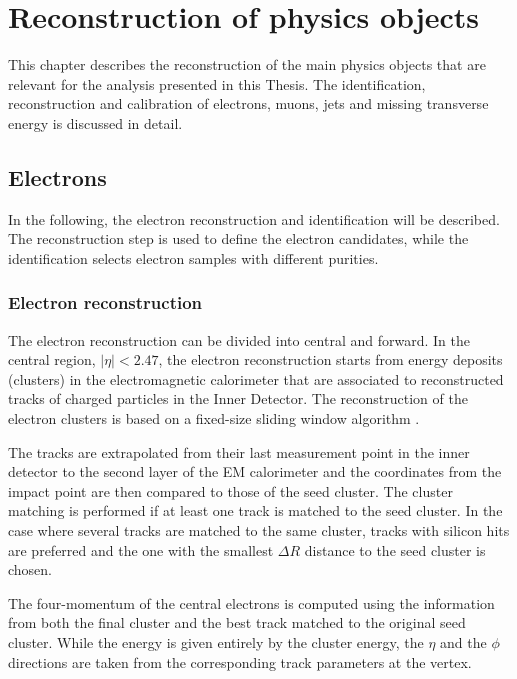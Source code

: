 \chapter{Reconstruction of physics objects}
    \label{chapter:ReconstructionOfObjects}

This chapter describes the reconstruction of the main physics objects that are relevant for the analysis presented in this Thesis.
The identification, reconstruction and calibration of electrons, muons, jets and missing transverse energy is discussed in detail.

\section{Electrons}
    \label{sec:ElectronReco}

In the following, the electron reconstruction and identification will be described.
The reconstruction step is used to define the electron candidates, while the identification selects electron samples with different purities.

\subsection{Electron reconstruction}
    \label{subsec:ElectronReconstruction}

The electron reconstruction can be divided into central and forward.
In the central region, $|\eta|<2.47$, the electron reconstruction starts from energy deposits (clusters) in the electromagnetic calorimeter that are associated to reconstructed tracks of charged particles in the Inner Detector.
The reconstruction of the electron clusters is based on a fixed-size sliding window algorithm \cite{Lampl:2008zz}.

The tracks are extrapolated from their last measurement point in the inner detector to the second layer of the EM calorimeter and the coordinates from the impact point are then compared to those of the seed cluster.
The cluster matching is performed if at least one track is matched to the seed cluster.
In the case where several tracks are matched to the same cluster, tracks with silicon hits are preferred and the one with the smallest $\Delta R$ distance to the seed cluster is chosen.

The four-momentum of the central electrons is computed using the information from both the final cluster and the best track matched to the original seed cluster.
While the energy is given entirely by the cluster energy, the $\eta$ and the $\phi$ directions are taken from the corresponding track parameters at the vertex.

